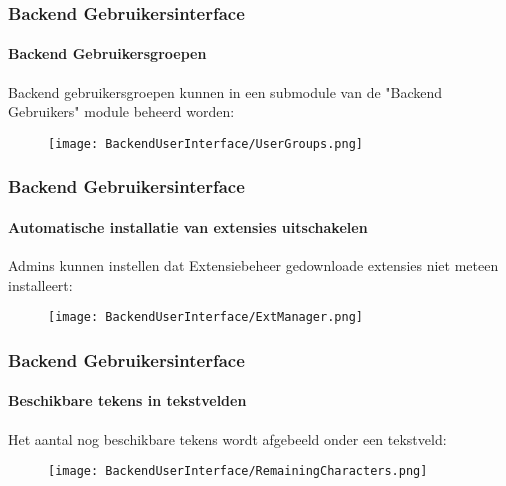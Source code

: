 \begin{frame}[fragile]
	\frametitle{Backend Gebruikersinterface}
	\framesubtitle{Backend Gebruikersgroepen}

	Backend gebruikersgroepen kunnen in een submodule van de "Backend Gebruikers"
	module beheerd worden:

	\begin{figure}
		\texttt{[image: BackendUserInterface/UserGroups.png]}
	\end{figure}

\end{frame}

\begin{frame}[fragile]
	\frametitle{Backend Gebruikersinterface}
	\framesubtitle{Automatische installatie van extensies uitschakelen}

	Admins kunnen instellen dat Extensiebeheer gedownloade extensies
	niet meteen installeert:

	\begin{figure}
		\texttt{[image: BackendUserInterface/ExtManager.png]}
	\end{figure}

\end{frame}

\begin{frame}[fragile]
	\frametitle{Backend Gebruikersinterface}
	\framesubtitle{Beschikbare tekens in tekstvelden}

	Het aantal nog beschikbare tekens wordt afgebeeld onder een tekstveld:

	\begin{figure}
		\texttt{[image: BackendUserInterface/RemainingCharacters.png]}
	\end{figure}

\end{frame}

